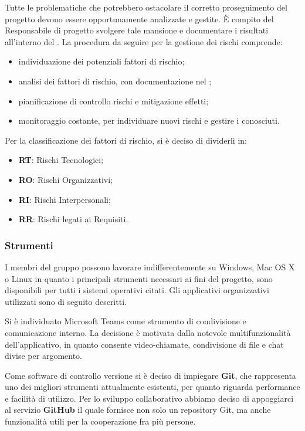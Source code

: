 			
			Tutte le problematiche che potrebbero ostacolare il corretto proseguimento del progetto devono essere opportunamente analizzate e gestite. È compito del Responsabile di progetto svolgere tale mansione e documentare i risultati all'interno del \PdP{}. La procedura da seguire per la gestione dei rischi comprende:
			\begin{itemize}
				\item individuazione dei potenziali fattori di rischio;
				\item analisi dei fattori di rischio, con documentazione nel \PdP{};
				\item pianificazione di controllo rischi e mitigazione effetti;
				\item monitoraggio costante, per individuare nuovi rischi e gestire i conosciuti.
			\end{itemize}
			Per la classificazione dei fattori di rischio, si è deciso di dividerli in:
			\begin{itemize}
				\item \textbf{RT}: Rischi Tecnologici;
				\item \textbf{RO}: Rischi Organizzativi;
				\item \textbf{RI}: Rischi Interpersonali;
				\item \textbf{RR}: Rischi legati ai Requisiti.
			\end{itemize}
		
		\subsubsection{Strumenti}
			I membri del gruppo \Gruppo{} possono lavorare indifferentemente su Windows, Mac OS X o Linux in quanto i principali strumenti necessari ai fini del progetto, sono disponibili per tutti i sistemi operativi citati. Gli applicativi organizzativi utilizzati sono di seguito descritti.
			
				Si è individuato Microsoft Teams come strumento di condivisione e comunicazione interno. La decisione è motivata dalla notevole multifunzionalità dell'applicativo, in quanto consente video-chiamate, condivisione di file e chat divise per argomento.
				
				Come software di controllo versione si è deciso di impiegare \textbf{Git}, che rappresenta uno dei migliori strumenti attualmente esistenti, per quanto riguarda performance e facilità di utilizzo. Per lo sviluppo collaborativo abbiamo deciso di appoggiarci al servizio \textbf{GitHub} il quale fornisce non solo un repository\ped{\textit{G}} Git, ma anche funzionalità utili per la cooperazione fra più persone.
							
